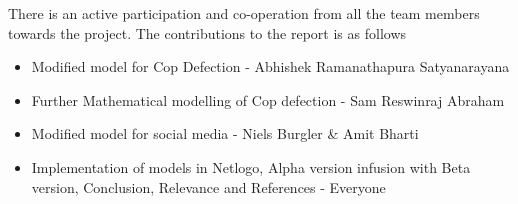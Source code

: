 \documentclass[a4paper,11pt]{article}
\begin{document}
There is an active participation and co-operation from all the team members towards the project. The contributions to the report is as follows
\begin{itemize}
    \item Modified model for Cop Defection - Abhishek Ramanathapura Satyanarayana
    \item Further Mathematical modelling of Cop defection - Sam Reswinraj Abraham
    \item Modified model for social media  - Niels Burgler \& Amit Bharti
    \item Implementation of models in Netlogo, Alpha version infusion with Beta version, Conclusion, Relevance and References - Everyone
\end{itemize}


\printbibliography
\end{document}
